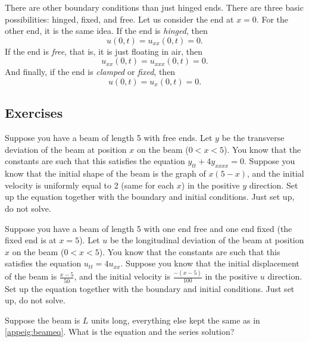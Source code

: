 There are other boundary conditions than just hinged ends.  There are
three basic possibilities: hinged, fixed, and free.  Let us consider
the end at $x=0$.  For the other end, it is the same idea.
If the end is \emph{hinged}, then
\begin{equation*}
u(0,t) = u_{xx}(0,t) = 0 .
\end{equation*}
If the end is \emph{free}, that is, it is just
floating in air, then
\begin{equation*}
u_{xx}(0,t) = u_{xxx}(0,t) = 0 .
\end{equation*}
And finally, if the end is
\emph{clamped}
or  
\emph{fixed},
then
\begin{equation*}
u(0,t) = u_{x}(0,t) = 0 .
\end{equation*}


\subsection{Exercises}

\begin{exercise}
Suppose you have a beam of length 5 with free ends.  Let $y$ be the
transverse deviation of the beam at position $x$ on the beam ($0 < x < 5$).
You know that the
constants are such that this satisfies the equation $y_{tt} + 4 y_{xxxx} =
0$.   Suppose you know that the initial shape of the beam is the graph of
$x(5-x)$, and the initial velocity is uniformly equal to 2 (same for each $x$)
in the positive $y$ direction.  Set up the equation together with the
boundary and initial conditions.  Just set up, do not solve.
\end{exercise}

\begin{exercise}
Suppose you have a beam of length 5 with one end free and one end fixed
(the fixed end is at $x=5$).
Let $u$ be the
longitudinal deviation of the beam at position $x$ on the beam ($0 < x < 5$).
You know that the
constants are such that this satisfies the equation $u_{tt} = 4 u_{xx}$.
Suppose you know that the initial displacement of the beam
is $\frac{x-5}{50}$, and the initial velocity is $\frac{-(x-5)}{100}$
in the positive $u$ direction.  Set up the equation together with the
boundary and initial conditions.  Just set up, do not solve.
\end{exercise}

\begin{exercise}
Suppose the beam is $L$ units long, everything else kept the same
as in \eqref{appeig:beameq}.  What is the equation and the series
solution?
\end{exercise}

